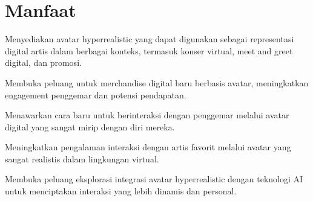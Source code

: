 \section{Manfaat}

\begin{enumarate}
    \item Menyediakan avatar hyperrealistic yang dapat digunakan sebagai representasi digital artis dalam berbagai konteks, termasuk konser virtual, meet and greet digital, dan promosi.
    \item Membuka peluang untuk merchandise digital baru berbasis avatar, meningkatkan engagement penggemar dan potensi pendapatan.
    \item Menawarkan cara baru untuk berinteraksi dengan penggemar melalui avatar digital yang sangat mirip dengan diri mereka.
    \item Meningkatkan pengalaman interaksi dengan artis favorit melalui avatar yang sangat realistis dalam lingkungan virtual.
    \item Membuka peluang eksplorasi integrasi avatar hyperrealistic dengan teknologi AI untuk menciptakan interaksi yang lebih dinamis dan personal.
\end{enumarate}

